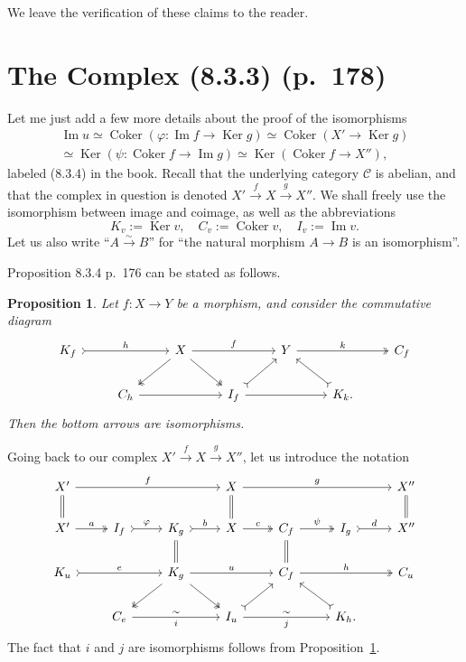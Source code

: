 \documentclass[12pt]{article}
\newtheorem{prop}[thm]{Proposition}
\theoremstyle{remark}
\theoremstyle{definition}
\newcommand{\C}{\mathcal C}
\newcommand{\p}{\varphi}
\newcommand{\bp}{\begin{prop}}
\newcommand{\ep}{\end{prop}}
\newcommand{\pr}{Proposition}
\DeclareMathOperator{\Coker}{Coker}
\DeclareMathOperator{\Ima}{Im}
\DeclareMathOperator{\Ker}{Ker}
\begin{document}
We leave the verification of these claims to the reader. 
%
\section{The Complex (8.3.3) (p.~178)} %
%
Let me just add a few more details about the proof of the isomorphisms
\begin{equation}\label{834}
\begin{split}
\Ima u\simeq\Coker(\p:\Ima f\to\Ker g)\simeq\Coker(X'\to\Ker g)\\ 
\simeq\Ker(\psi:\Coker f\to\Ima g)\simeq\Ker(\Coker f\to X''),
\end{split}
\end{equation}
labeled (8.3.4) in the book. Recall that the underlying category $\C$ is abelian, and that the complex in question is denoted $X'\xrightarrow{f}X\xrightarrow{g}X''$. We shall freely use the isomorphism between image and coimage, as well as the abbreviations 
$$
K_v:=\Ker v,\quad C_v:=\Coker v,\quad I_v:=\Ima v.
$$ 
Let us also write ``$A\overset{\sim}{\to}B$'' for ``the natural morphism $A\to B$ is an isomorphism''. 

Proposition 8.3.4 p.~176 can be stated as follows. 
%
\bp\label{p834}
Let $f:X\to Y$ be a morphism, and consider the commutative diagram 
$$
\begin{tikzcd}
K_f\ar[tail]{rr}{h}&&X\ar{rr}{f}\ar[two heads]{dl}\ar[two heads]{dr}&&Y\ar[two heads]{rr}{k}&&C_f\\ 
&C_h\ar{rr}&&I_f\ar[tail]{ur}\ar{rr}&&K_k.\ar[tail]{ul}
\end{tikzcd}
$$ 
Then the bottom arrows are isomorphisms.
\ep
% 
Going back to our complex $X'\overset{f}{\to}X\overset{g}{\to}X''$, let us introduce the notation 
$$
\begin{tikzcd}
X'\ar{rrr}{f}\ar[equal]{d}&&&X\ar[equal]{d}\ar{rrr}{g}&&&X''\ar[equal]{d}\\ 
X'\ar[two heads]{r}{a}&I_f\ar[tail]{r}{\p}&K_g\ar[equal]{d}\ar[tail]{r}{b}&X\ar[two heads]{r}{c}&C_f\ar[equal]{d}\ar[two heads]{r}{\psi}&I_g\ar[tail]{r}{d}&X''\\ 
K_u\ar[tail]{rr}{e}&&K_g\ar[two heads]{dl}\ar[two heads]{dr}\ar{rr}{u}&&C_f\ar[two heads]{rr}{h}&&C_u\\ 
&C_e\ar{rr}{\sim}[swap]{i}&&I_u\ar[tail]{ur}\ar{rr}{\sim}[swap]{j}&&K_h.\ar[tail]{ul}
\end{tikzcd}
$$ 
The fact that $i$ and $j$ are isomorphisms follows from \pr\ \ref{p834}. 
\end{document}
